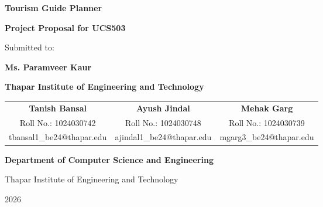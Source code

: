 \documentclass[12pt,a4paper]{article}
\begin{document}

\begin{titlepage}

\begin{center}

\vspace*{0.7cm}

{\Huge \textbf{Tourism Guide Planner}}

\vspace{0.6cm}

{\Large \textbf{Project Proposal for UCS503}}

\vspace{1cm}

{\large Submitted to:}

\vspace{0.2cm}

{\Large \textbf{Ms. Paramveer Kaur}}

\vspace{0.4cm}

{\Large \textbf{Thapar Institute of Engineering and Technology}}

\vspace{1.2cm}

\begin{tabular}{ccc}

\textbf{Tanish Bansal}
&
\textbf{Ayush Jindal}
&
\textbf{Mehak Garg}
\\[0.25cm]

Roll No.: 1024030742
&
Roll No.: 1024030748
&
Roll No.: 1024030739
\\[0.15cm]

tbansal1\_be24@thapar.edu
&
ajindal1\_be24@thapar.edu
&
mgarg3\_be24@thapar.edu

\end{tabular}

\vfill

{\large \textbf{Department of Computer Science and Engineering}}

\vspace{0.25cm}

{\large Thapar Institute of Engineering and Technology}

\vspace{0.25cm}

{\large 2026}

\end{center}

\end{titlepage}
\end{document}
